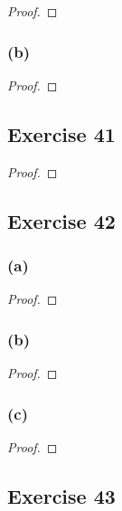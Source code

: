 \documentclass[14pt]{extarticle}
\begin{document}
\begin{proof}

\end{proof}

\subsubsection{(b)}

\begin{proof}

\end{proof}

\subsection{Exercise 41}

\begin{proof}

\end{proof}

\subsection{Exercise 42}

\subsubsection{(a)}

\begin{proof}

\end{proof}

\subsubsection{(b)}

\begin{proof}

\end{proof}

\subsubsection{(c)}

\begin{proof}

\end{proof}

\subsection{Exercise 43}
\end{document}
